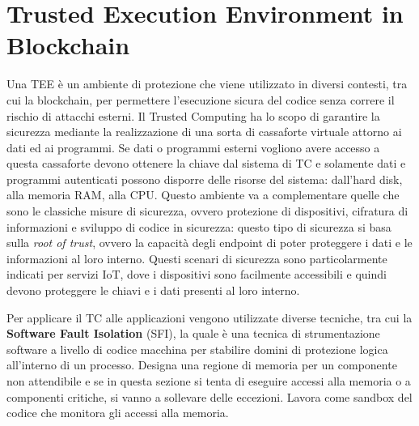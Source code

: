 \chapter{Trusted Execution Environment in Blockchain}
Una TEE è un ambiente di protezione che viene utilizzato in diversi contesti, tra cui la blockchain, per permettere l'esecuzione sicura del codice senza correre il rischio di attacchi esterni. Il Trusted Computing ha lo scopo di garantire la sicurezza mediante la realizzazione di una sorta di cassaforte virtuale attorno ai dati ed ai programmi. Se dati o programmi esterni vogliono avere accesso a questa cassaforte devono ottenere la chiave dal sistema di TC e solamente dati e programmi autenticati possono disporre delle risorse del sistema: dall'hard disk, alla memoria RAM, alla CPU. Questo ambiente va a complementare quelle che sono le classiche misure di sicurezza, ovvero protezione di dispositivi, cifratura di informazioni e sviluppo di codice in sicurezza: questo tipo di sicurezza si basa sulla \textit{root of trust}, ovvero la capacità degli endpoint di poter proteggere i dati e le informazioni al loro interno. Questi scenari di sicurezza sono particolarmente indicati per servizi IoT, dove i dispositivi sono facilmente accessibili e quindi devono proteggere le chiavi e i dati presenti al loro interno.

\vspace{5mm}

Per applicare il TC alle applicazioni vengono utilizzate diverse tecniche, tra cui la \textbf{Software Fault Isolation} (SFI), la quale è una tecnica di strumentazione software a livello di codice macchina per stabilire domini di protezione logica all'interno di un processo. Designa una regione di memoria per un componente non attendibile e se in questa sezione si tenta di eseguire accessi alla memoria o a componenti critiche, si vanno a sollevare delle eccezioni. Lavora come sandbox del codice che monitora gli accessi alla memoria.

